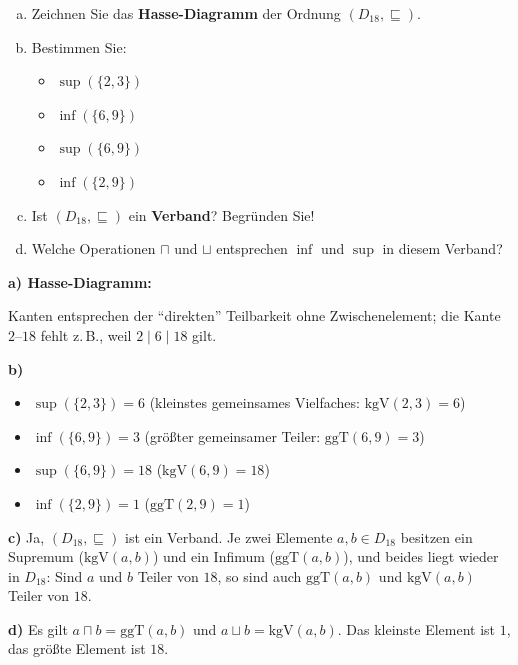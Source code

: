 \begin{enumerate}[a)]
  \item Zeichnen Sie das \textbf{Hasse-Diagramm} der Ordnung $(D_{18}, \sqsubseteq)$.
  \item Bestimmen Sie:
  \begin{itemize}
    \item $\sup(\{2, 3\})$
    \item $\inf(\{6, 9\})$
    \item $\sup(\{6, 9\})$
    \item $\inf(\{2, 9\})$
  \end{itemize}
  \item Ist $(D_{18}, \sqsubseteq)$ ein \textbf{Verband}? Begründen Sie!
  \item Welche Operationen $\sqcap$ und $\sqcup$ entsprechen $\inf$ und $\sup$ in diesem Verband?
\end{enumerate}

\begin{loesung}
\textbf{a) Hasse-Diagramm:}

\begin{center}
\end{center}

Kanten entsprechen der \enquote{direkten} Teilbarkeit ohne Zwischenelement; die Kante $2$--$18$ fehlt z.\,B., weil $2\mid 6\mid 18$ gilt.

\textbf{b)}
\begin{itemize}
  \item $\sup(\{2,3\}) = 6$ \;(kleinstes gemeinsames Vielfaches: $\text{kgV}(2,3)=6$)
  \item $\inf(\{6,9\}) = 3$ \;(größter gemeinsamer Teiler: $\text{ggT}(6,9)=3$)
  \item $\sup(\{6,9\}) = 18$ \;($\text{kgV}(6,9)=18$)
  \item $\inf(\{2,9\}) = 1$ \;($\text{ggT}(2,9)=1$)
\end{itemize}

\textbf{c)} Ja, $(D_{18},\sqsubseteq)$ ist ein Verband. Je zwei Elemente $a,b\in D_{18}$ besitzen ein Supremum ($\text{kgV}(a,b)$) und ein Infimum ($\text{ggT}(a,b)$), und beides liegt wieder in $D_{18}$: Sind $a$ und $b$ Teiler von $18$, so sind auch $\text{ggT}(a,b)$ und $\text{kgV}(a,b)$ Teiler von $18$.

\textbf{d)} Es gilt $a\sqcap b = \text{ggT}(a,b)$ und $a\sqcup b = \text{kgV}(a,b)$. Das kleinste Element ist $1$, das größte Element ist $18$.
\end{loesung}

